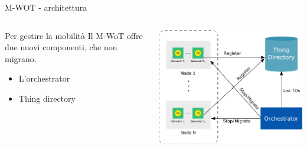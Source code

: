 \documentclass{beamer}
\begin{document}
\begin{frame}{M-WOT - architettura}
	\begin{columns}
		\begin{column}[c]{0.5\textwidth}
			\begin{block}{Per gestire la mobilità}
			 	Il M-WoT offre due nuovi componenti, che non migrano.
			 	\begin{itemize}
			 		\item L'orchestrator
			 		\item Thing directory
			 	\end{itemize}
			\end{block}
		\end{column}
		\begin{column}[c]{0.45\textwidth}
			\centering
			\includegraphics[width=\textwidth]{./images/7.png}
		\end{column}
	\end{columns}
\end{frame}
\end{document}

